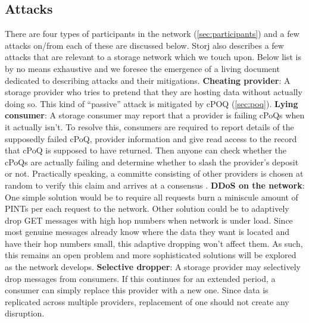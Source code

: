 \subsection{Attacks}
There are four types of participants in the network (\cref{sec:participants}) and a few attacks on/from each of these are discussed below. Storj \cite{Storj} also describes a few attacks that are relevant to a storage network which we touch upon. Below list is by no means exhaustive and we foresee the emergence of a living document dedicated to describing attacks and their mitigations.
\newline\newline
\textbf{Cheating provider}: A storage provider who tries to pretend that they are hosting data without actually doing so. This kind of ``passive'' attack is mitigated by cPOQ (\cref{sec:poq}).
\newline\newline
\textbf{Lying consumer}: A storage consumer may report that a provider is failing cPoQs when it actually isn't. To resolve this, consumers are required to report details of the supposedly failed cPoQ, provider information and give read access to the record that cPoQ is supposed to have returned. Then anyone can check whether the cPoQs are actually failing and determine whether to slash the provider's deposit or not. Practically speaking, a committe consisting of other providers is chosen at random to verify this claim and arrives at a consensus \cite{algorand}. 
\newline\newline
\textbf{DDoS on the network}: One simple solution would be to require all requests burn a miniscule amount of PINTs per each request to the network. Other solution could be to adaptively drop GET messages with high hop numbers when network is under load. Since most genuine messages already know where the data they want is located and have their hop numbers small, this adaptive dropping won't affect them. As such, this remains an open problem and more sophisticated solutions will be explored as the network develops.
\newline\newline
\textbf{Selective dropper}: A storage provider may selectively drop messages from consumers. If this continues for an extended period, a consumer can simply replace this provider with a new one. Since data is replicated across multiple providers, replacement of one should not create any disruption.
\newline\newline
